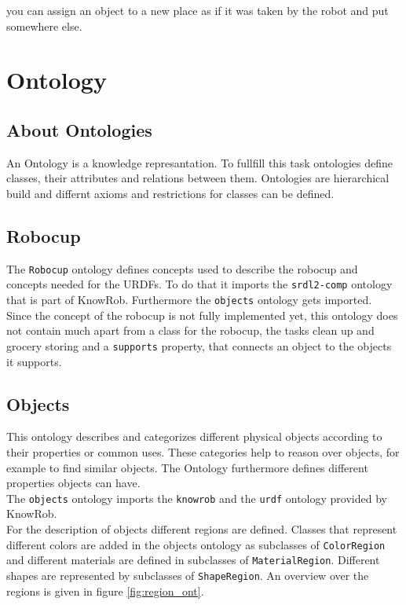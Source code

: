 \documentclass[main.tex]{subfiles}
\begin{document}
you can assign an object to a new place as if it was taken by the robot and put somewhere else.

\section{Ontology}
\subsection{About Ontologies}
An Ontology is a knowledge represantation. To fullfill this task ontologies define classes, their attributes and relations between them. Ontologies are hierarchical build and differnt axioms and restrictions for classes can be defined.


\subsection{Robocup}
The \texttt{Robocup} ontology defines concepts used to describe the robocup and concepts needed for the URDFs. To do that it imports the \texttt{srdl2-comp} ontology that is part of KnowRob. Furthermore the \texttt{objects} ontology gets imported.\\
Since the concept of the robocup is not fully implemented yet, this ontology does not contain much apart from a class for the robocup, the tasks clean up and grocery storing and a \texttt{supports} property, that connects an object to the objects it supports.

\subsection{Objects}

This ontology describes and categorizes different physical objects according to their properties or common uses. These categories help to reason over objects, for example to find similar objects. The Ontology furthermore defines different properties objects can have. \\
The \texttt{objects} ontology imports the \texttt{knowrob} and the \texttt{urdf} ontology provided by KnowRob.\\
For the description of objects different regions are defined. Classes that represent different colors are added in the objects ontology as subclasses of \texttt{ColorRegion} and different materials are defined in subclasses of \texttt{MaterialRegion}. Different shapes are represented by subclasses of \texttt{ShapeRegion}. An overview over the regions is given in figure \ref{fig:region_ont}.
\end{document}
